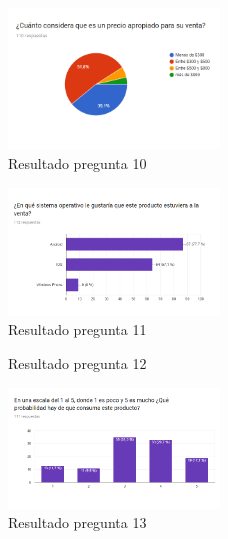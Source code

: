 \begin{figure}[H]
	\centering
	\includegraphics[width=0.5\textwidth]{Apendice2/img/Precio}
	\caption{Resultado pregunta 10}
\end{figure}
\begin{figure}[H]
	\centering
	\includegraphics[width=0.5\textwidth]{Apendice2/img/SO}
	\caption{Resultado pregunta 11}
\end{figure}
\begin{figure}[H]
	\centering
	\caption{Resultado pregunta 12}
\end{figure}
\begin{figure}[H]
	\centering
	\includegraphics[width=0.5\textwidth]{Apendice2/img/Consumir}
	\caption{Resultado pregunta 13}
\end{figure}